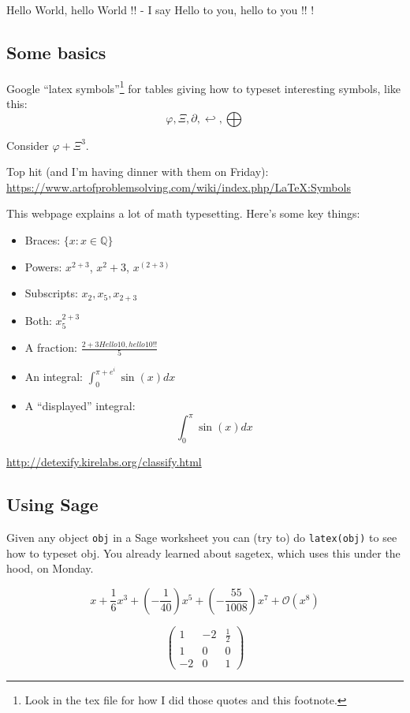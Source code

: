 \newcommand{\hello}[1]{Hello #1, hello #1 !! }

\hello{World} - I say \hello{to you}!

\subsection{Some basics}
Google ``latex symbols''\footnote{Look in the tex file for how I did those quotes and this footnote.} for tables giving how to typeset
interesting symbols, like this:
$$
\varphi, \Xi, \partial, \hookleftarrow, \bigoplus
$$

Consider $\varphi + \Xi^3$.

Top hit (and I'm having dinner with them on Friday):\\ \url{https://www.artofproblemsolving.com/wiki/index.php/LaTeX:Symbols}

This webpage explains a lot of math typesetting.  Here's
some key things:
\begin{itemize}
\item Braces: $\{ x : x \in \mathbb{Q}\}$
\item Powers: $x^{2+3}$,    $x^2+3$,  $x^(2+3)$
\item Subscripts: $x_2, x_5, x_{2+3}$
\item Both: $x^{2+3}_{5}$
\item A fraction: $\frac{2+3 \hello{10}}{5}$
\item An integral: $\int_0^{\pi+e^i} \sin(x) dx$
\item A ``displayed'' integral: $$\int_0^{\pi} \sin(x) dx$$
\end{itemize}

\url{http://detexify.kirelabs.org/classify.html}

\subsection{Using Sage}

Given any object {\tt obj} in a Sage worksheet you
can (try to) do {\tt latex(obj)} to see how to typeset
obj.   You already learned about sagetex, which uses
this under the hood, on Monday.

$$
x + \frac{1}{6} x^{3} + {(-\frac{1}{40})} x^{5} + {(-\frac{55}{1008})} x^{7} + \mathcal{O}\left(x^{8}\right)
$$

$$
\displaystyle \left(\begin{array}{rrr}
1 & -2 & \frac{1}{2} \\
1 & 0 & 0 \\
-2 & 0 & 1
\end{array}\right)
$$

